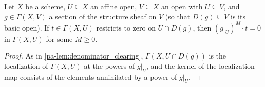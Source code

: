 \begin{lemma}
  \label{pa-lem:section_annihilation}
  \leanok

  Let \(X\) be a scheme, \(U \subseteq X\) an affine open, \(V \subseteq X\) an open with
  \(U \subseteq V\), and \(g \in \Gamma(X, V)\) a section of the structure sheaf on \(V\) (so
  that \(D(g) \subseteq V\) is its basic open). If \(t \in \Gamma(X, U)\) restricts to zero
  on \(U \cap D(g)\), then \((g|_U)^{M} \cdot t = 0\) in \(\Gamma(X, U)\) for some \(M \ge 0\).
\end{lemma}
\begin{proof}
  \leanok
  As in \ref{pa-lem:denominator_clearing}, \(\Gamma(X, U \cap D(g))\) is the localization of
  \(\Gamma(X, U)\) at the powers of \(g|_U\), and the kernel of the localization map consists
  of the elements annihilated by a power of \(g|_U\).
\end{proof}

